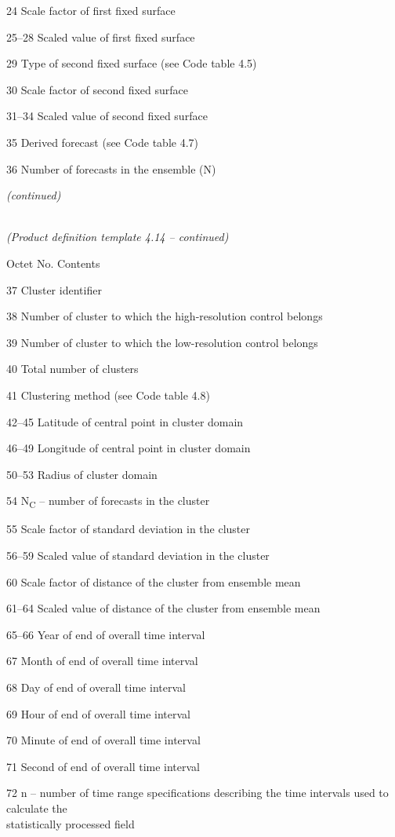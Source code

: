 24 Scale factor of first fixed surface

25--28 Scaled value of first fixed surface

29 Type of second fixed surface (see Code table 4.5)

30 Scale factor of second fixed surface

31--34 Scaled value of second fixed surface

35 Derived forecast (see Code table 4.7)

36 Number of forecasts in the ensemble (N)

\emph{(continued)}

\emph{\\
(Product definition template 4.14 -- continued)}

Octet No. Contents

37 Cluster identifier

38 Number of cluster to which the high-resolution control belongs

39 Number of cluster to which the low-resolution control belongs

40 Total number of clusters

41 Clustering method (see Code table 4.8)

42--45 Latitude of central point in cluster domain

46--49 Longitude of central point in cluster domain

50--53 Radius of cluster domain

54 N\textsubscript{C} -- number of forecasts in the cluster

55 Scale factor of standard deviation in the cluster

56--59 Scaled value of standard deviation in the cluster

60 Scale factor of distance of the cluster from ensemble mean

61--64 Scaled value of distance of the cluster from ensemble mean

65--66 Year of end of overall time interval

67 Month of end of overall time interval

68 Day of end of overall time interval

69 Hour of end of overall time interval

70 Minute of end of overall time interval

71 Second of end of overall time interval

72 n -- number of time range specifications describing the time intervals used to calculate the\\
statistically processed field

